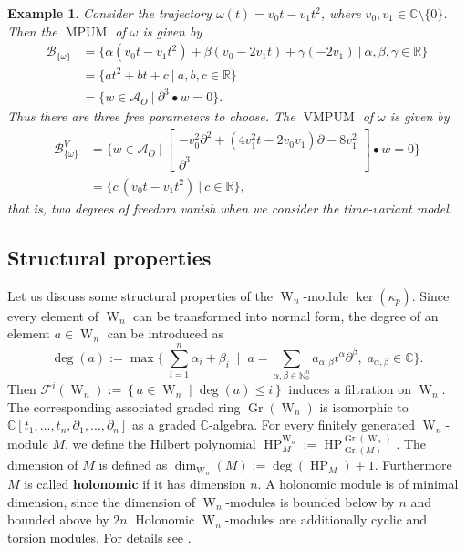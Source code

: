 \documentclass[a4paper,10pt]{article}
\newtheorem{ex}[Th]{Example}
\theoremstyle{nonumberplain}
\newcommand{\R}{\mathbb{R}}
\newcommand{\C}{\mathbb{C}}
\newcommand{\N}{\mathbb{N}}
\DeclareMathOperator{\W}{W}
\DeclareMathOperator{\g}{g}
\DeclareMathOperator{\Gr}{Gr}
\DeclareMathOperator{\MPUM}{MPUM}
\DeclareMathOperator{\VMPUM}{VMPUM}
\DeclareMathOperator{\HP}{HP}
\begin{document}
\begin{ex}\label{wurf}
Consider the trajectory
$\omega(t)=v_0 t - v_1 t^2$, where $v_0,v_1\in{\C}\setminus\{0\}$.
Then the $\MPUM$ of $\omega$ is given by
\begin{align*}
 \mathcal{B}_{\{\omega\}} &= \{ \alpha (v_0t-v_1t^2)+\beta(v_0-2v_1t)+
\gamma (-2v_1) \ | \ \alpha, \beta, \gamma \in \R  \} \\
  & = \{ at^2 + bt +c \ | \ a, b, c \in \R \}\\
  & =  \{ w \in \mathcal{A}_O \ | \ \partial^3 \bullet w = 0 \}. 
\end{align*}
Thus there are three free parameters to choose. 
The $\VMPUM$ of $\omega$ is given by
\begin{align*}
 \mathcal{B}^V_{\{ \omega\}} & 
=\{ w \in \mathcal{A}_O \ | \  \left[ \begin{array}{c} -v_0^2 \partial^2+(4v_1^2 t- 2v_0v_1)\partial-8v_1^2  \\ \partial^3 \end{array} \right]  \bullet w = 0 \} \\
& = \{ c \, ( v_0 t - v_1 t^2 ) \ | \ c \in \R \},
\end{align*}
that is, two degrees of freedom vanish when we consider the time-variant model.
\end{ex}



\subsection{Structural properties} 


Let us discuss some structural properties of the $\W_n$-module $\ker(\kappa_p)$.
Since every element of $\W_n$ can be transformed into normal form, 
the degree of an element $a\in\W_n$ can be introduced as
$$ \deg(a):= \max \lbrace \; \sum_{i=1}^n \alpha_i + \beta_i  \;\; | \;\; a = \sum_{\alpha, \beta \in \N_0^n} a_{\alpha, \beta} 
t^{\alpha} \partial^{\beta}, \; a_{\alpha, \beta} \in \C \rbrace. $$ 
Then $\mathcal{F}^i(\W_n):=\left\lbrace a \in \W_n \; | \; \deg(a)\leq i \right\rbrace $ induces a filtration 
on $\W_n$. The 
corresponding associated graded ring $\Gr(\W_n)$ is isomorphic to 
$\C[t_1, \dots, t_n, \!\partial_1, \dots, \partial_n]$ as a graded $\C$-algebra.
For every finitely generated $\W_n$-module $M$, 
we define the Hilbert polynomial 
$\HP_M^{\W_n}:=\HP_{\Gr(M)}^{\Gr(\W_n)}$. 
The dimension of $M$ is defined as $\dim_{\W_n}(M):=\deg(\HP_M)+1.$ 
Furthermore $M$ is called \textbf{holonomic} if it has dimension $n$. A holonomic module is of 
minimal dimension, since the dimension of $\W_n$-modules is bounded below by $n$ and bounded 
above by $2n$. Holonomic $\W_n$-modules are additionally cyclic and torsion modules. For details see \cite{C}.
\end{document}
